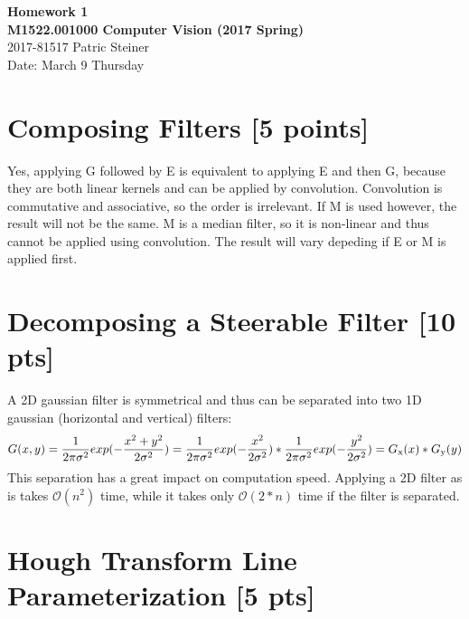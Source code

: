 \documentclass[12pt,a4paper]{article}
\begin{document}
\begin{center}
    {\bf\large Homework 1} \\
    {\bf\large M1522.001000 Computer Vision (2017 Spring)} \\
    2017-81517 Patric Steiner \\
    Date: March 9 Thursday
\end{center}

\section{Composing Filters [5 points]}

Yes, applying G followed by E is equivalent to applying E and then G, because they are both linear kernels and can be applied by convolution. Convolution is commutative and associative, so the order is irrelevant.
If M is used however, the result will not be the same. M is a median filter, so it is non-linear and thus cannot be applied using convolution. The result will vary depeding if E or M is applied first.

\section{Decomposing a Steerable Filter [10 pts]}

A 2D gaussian filter is symmetrical and thus can be separated into two 1D gaussian (horizontal and vertical) filters:
\begin{equation}
    G(x,y) = \frac{1}{2\pi\sigma^2} exp(-\frac{x^2+y^2}{2\sigma^2}) \\
    = \frac{1}{2\pi\sigma^2} exp(-\frac{x^2}{2\sigma^2}) * \frac{1}{2\pi\sigma^2} exp(-\frac{y^2}{2\sigma^2}) \\
    = G\textsubscript{x}(x) * G\textsubscript{y}(y)
\end{equation}
This separation has a great impact on computation speed. Applying a 2D filter as is takes $\mathcal{O}(n^2)$ time, while it takes only $\mathcal{O}(2*n)$ time if the filter is separated.

\section{Hough Transform Line Parameterization [5 pts]}
\end{document}
